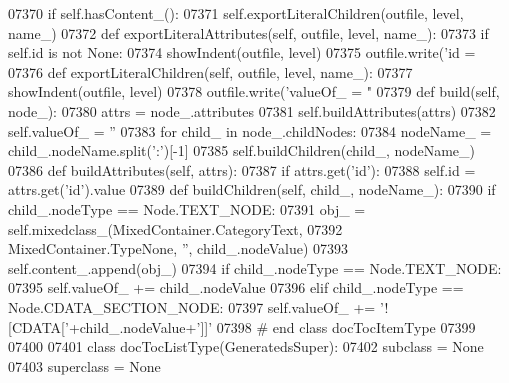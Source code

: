 \begin{DoxyCode}
{{{{{{{{{{{{{{{{{{{{{{{{{{{{{{{{{{{{{{{{{{{{{{{{{{{{{{{{{{{{{{{{{{{{{{{{{{{{{{{{{{{{{{{{{{{{{{{{{{{{{{{{{{{{{{{{{{{{{{{{{{{{{{{{{{{{{{{{{{{{{{{{{{{{{{{{{{{{{{{{{{{{{{{{{{{{{{{{{{{{{{{{{{{{{{{{{{{{{{{{{{{{{{{{{{{{{{{{{{{{{{{{{{{{{{{{{{{{{{{{{{{{{{{{{{{{{{{{{{{{{{{{{{{{{{{{{{{{{{{{{{{{{{{{{{{{{{{{{{{{{{{{{{{{{{{{{{{{{{{{{{{{{{{{{{{{{{{{{{{{{{{{{{{{{{{{{{{{{{{{{{{{{{{{{{{{{{{{{{{{{{{{{{{{{{{{{{{{{{{{{{{{{{{{{{{{{{{{{{{{{{{{{{{{{{{{{{{{{{{{{{{{{{{{{{{{{{{{{{{{{{{{{{07370         \textcolor{keywordflow}{if} self.hasContent_():
07371             self.exportLiteralChildren(outfile, level, name\_)
07372     \textcolor{keyword}{def }exportLiteralAttributes(self, outfile, level, name\_):
07373         \textcolor{keywordflow}{if} self.id \textcolor{keywordflow}{is} \textcolor{keywordflow}{not} \textcolor{keywordtype}{None}:
07374             showIndent(outfile, level)
07375             outfile.write(\textcolor{stringliteral}{'id = %
07376     \textcolor{keyword}{def }exportLiteralChildren(self, outfile, level, name\_):
07377         showIndent(outfile, level)
07378         outfile.write(\textcolor{stringliteral}{'valueOf\_ = "%
07379     \textcolor{keyword}{def }build(self, node\_):
07380         attrs = node\_.attributes
07381         self.buildAttributes(attrs)
07382         self.valueOf_ = \textcolor{stringliteral}{''}
07383         \textcolor{keywordflow}{for} child\_ \textcolor{keywordflow}{in} node\_.childNodes:
07384             nodeName\_ = child\_.nodeName.split(\textcolor{stringliteral}{':'})[-1]
07385             self.buildChildren(child\_, nodeName\_)
07386     \textcolor{keyword}{def }buildAttributes(self, attrs):
07387         \textcolor{keywordflow}{if} attrs.get(\textcolor{stringliteral}{'id'}):
07388             self.id = attrs.get(\textcolor{stringliteral}{'id'}).value
07389     \textcolor{keyword}{def }buildChildren(self, child\_, nodeName\_):
07390         \textcolor{keywordflow}{if} child\_.nodeType == Node.TEXT\_NODE:
07391             obj\_ = self.mixedclass_(MixedContainer.CategoryText,
07392                 MixedContainer.TypeNone, \textcolor{stringliteral}{''}, child\_.nodeValue)
07393             self.content\_.append(obj\_)
07394         \textcolor{keywordflow}{if} child\_.nodeType == Node.TEXT\_NODE:
07395             self.valueOf_ += child\_.nodeValue
07396         \textcolor{keywordflow}{elif} child\_.nodeType == Node.CDATA\_SECTION\_NODE:
07397             self.valueOf_ += \textcolor{stringliteral}{'![CDATA['}+child\_.nodeValue+\textcolor{stringliteral}{']]'}
07398 \textcolor{comment}{# end class docTocItemType}
07399 
07400 
07401 \textcolor{keyword}{class }docTocListType(GeneratedsSuper):
07402     subclass = \textcolor{keywordtype}{None}
07403     superclass = \textcolor{keywordtype}{None}
}}}}}}}}}}}}}}}}}}}}}}}}}}}}}}}}}}}}}}}}}}}}}}}}}}}}}}}}}}}}}}}}}}}}}}}}}}}}}}}}}}}}}}}}}}}}}}}}}}}}}}}}}}}}}}}}}}}}}}}}}}}}}}}}}}}}}}}}}}}}}}}}}}}}}}}}}}}}}}}}}}}}}}}}}}}}}}}}}}}}}}}}}}}}}}}}}}}}}}}}}}}}}}}}}}}}}}}}}}}}}}}}}}}}}}}}}}}}}}}}}}}}}}}}}}}}}}}}}}}}}}}}}}}}}}}}}}}}}}}}}}}}}}}}}}}}}}}}}}}}}}}}}}}}}}}}}}}}}}}}}}}}}}}}}}}}}}}}}}}}}}}}}}}}}}}}}}}}}}}}}}}}}}}}}}}}}}}}}}}}}}}}}}}}}}}}}}}}}}}}}}}}}}}}}}}}}}}}}}}}}}}}}}}}}}}}}}}}}}}}}}}}}}}}}}}}}}}}}}}}}}}}}}}}
\end{DoxyCode}
